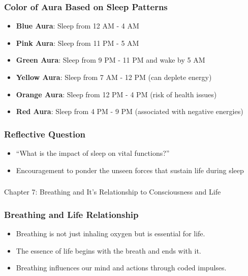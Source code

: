 \begin{frame}[fragile]\frametitle{Color of Aura Based on Sleep Patterns}
    \begin{itemize}
        \item \textbf{Blue Aura}: Sleep from 12 AM - 4 AM
        \item \textbf{Pink Aura}: Sleep from 11 PM - 5 AM
        \item \textbf{Green Aura}: Sleep from 9 PM - 11 PM and wake by 5 AM
        \item \textbf{Yellow Aura}: Sleep from 7 AM - 12 PM (can deplete energy)
        \item \textbf{Orange Aura}: Sleep from 12 PM - 4 PM (risk of health issues)
        \item \textbf{Red Aura}: Sleep from 4 PM - 9 PM (associated with negative energies)
    \end{itemize}
\end{frame}

\begin{frame}[fragile]\frametitle{Reflective Question}
    \begin{itemize}
        \item ``What is the impact of sleep on vital functions?''
        \item Encouragement to ponder the unseen forces that sustain life during sleep
    \end{itemize}
\end{frame}

\begin{frame}[fragile]\frametitle{}
\begin{center}
{\Large Chapter 7: Breathing and It's Relationship to Consciousness and Life}
\end{center}
\end{frame}

\begin{frame}[fragile]\frametitle{Breathing and Life Relationship}
    \begin{itemize}
        \item Breathing is not just inhaling oxygen but is essential for life.
        \item The essence of life begins with the breath and ends with it.
        \item Breathing influences our mind and actions through coded impulses.
    \end{itemize}
\end{frame}

